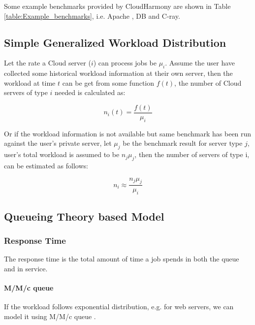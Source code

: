 Some example benchmarks provided by CloudHarmony are shown in Table \ref{table:Example_benchmarks}, i.e. Apache \cite{Apache_benchmark}, DB and C-ray.



\subsection{Simple Generalized Workload Distribution}

Let the rate a Cloud server ($i$) can process jobs be $\mu_{i}$.
Assume the user have collected some historical workload information at their own server, then the workload at time $t$ can be get from some function $f(t)$, the number of Cloud servers of type $i$ needed is calculated as:

\begin{equation}\label{eq:n}
n_i (t) = \frac{ f(t) }{\mu_{i}} 
\end{equation}

Or if the workload information is not available but same benchmark has been run against the user's private server, let $\mu_{j}$ be the benchmark result for server type $j$, user's total workload is assumed to be $n_j \mu_{j}$, then the number of servers of type i, can be estimated as follows:

\begin{equation}\label{eq:nprime}
n_i \approx \frac{ n_j \mu_{j} }{\mu_{i}} 
\end{equation}



\subsection{Queueing Theory based Model}



\subsubsection{Response Time}
The response time is the total amount of time a job spends in both the queue and in service. 



\paragraph{M/M/c queue}
If the workload follows exponential distribution, e.g. for web servers, we can model it using M/M/c queue \cite{MMc_queue_wiki}.

